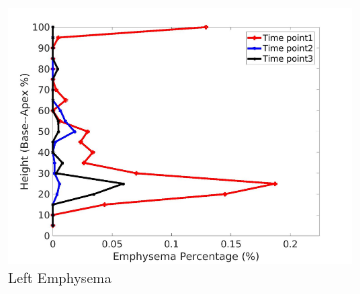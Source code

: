 \begin{figure}[H]
\begin{subfigure}{.42\linewidth}
  \includegraphics[width=\linewidth,trim={{.0\wd0} {.0\wd0} {.0\wd0} {.0\wd0}},clip]{Appendix/Image_AppexA/BaseToApex/IPF9LeftLungEmphysemaDiseaseAgainstHeight.jpg} %
  \caption{Left Emphysema}
  \label{fig:IPF9DiseaseAgainstHeight-g} 
\end{subfigure} 
\begin{subfigure}{.42\linewidth}%

\end{subfigure}
\end{figure}
